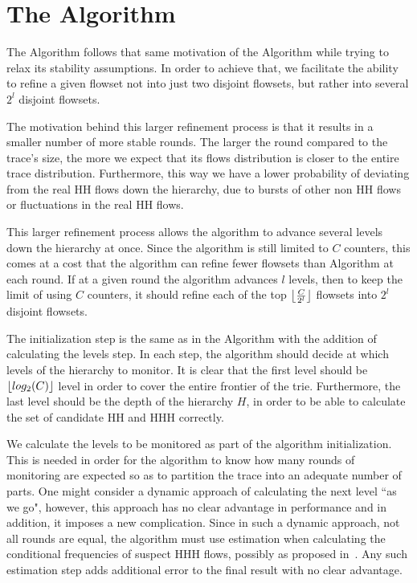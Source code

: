 \section{The \multipleAlgo Algorithm}
The \multipleAlgo Algorithm follows that same motivation of the \simpleAlgo Algorithm while trying to relax its stability assumptions.
In order to achieve that, we facilitate the ability to refine a given flowset not into just two disjoint flowsets, but rather into several $2^l$ disjoint flowsets.

The motivation behind this larger refinement process is that it results in a smaller number of more stable rounds. The larger the round compared to the trace's size, the more we expect that its flows distribution is closer to the entire trace distribution. Furthermore, this way we have a lower probability of deviating from the real HH flows down the hierarchy, due to bursts of other non HH flows or fluctuations in the real HH flows.

This larger refinement process allows the algorithm to advance several levels down the hierarchy at once. Since the algorithm is still limited to $C$ counters, this comes at a cost that the algorithm can refine fewer flowsets than \simpleAlgo Algorithm at each round. If at a given round the algorithm advances $l$ levels, then to keep the limit of using $C$ counters, it should refine each of the top $\left\lfloor \frac{C}{2^l} \right\rfloor$ flowsets into $2^l$ disjoint flowsets.
 
The initialization step is the same as in the \simpleAlgo Algorithm with the addition of calculating the levels step. In each step, the algorithm should decide at which levels of the hierarchy to monitor. It is clear that the first level should be $\left\lfloor log_2(C) \right\rfloor$ level in order to cover the entire frontier of the trie. Furthermore, the last level should be the depth of the hierarchy $H$, in order to be able to calculate the set of candidate HH and HHH correctly.

We calculate the levels to be monitored as part of the algorithm initialization. This is needed in order for the algorithm to know how many rounds of monitoring are expected so as to partition the trace into an adequate number of parts. One might consider a dynamic approach of calculating the next level ``as we go", however, this approach has no clear advantage in performance and in addition, it imposes a new complication. Since in such a dynamic approach, not all rounds are equal, the algorithm must use estimation when calculating the conditional frequencies of suspect HHH flows, possibly as proposed in~\cite{Zhang2004}. Any such estimation step adds additional error to the final result with no clear advantage.

